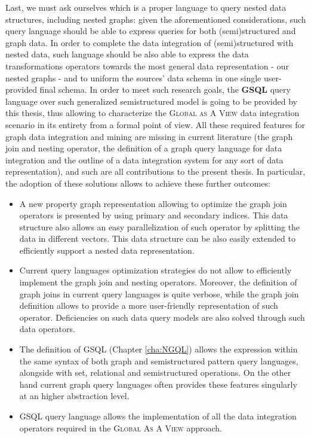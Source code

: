 Last, we must ask ourselves which is a proper language to query nested data structures, including nested graphs: given the aforementioned considerations, such query language should be able to  express queries for both (semi)structured and graph data. In order to complete the data integration of (semi)structured with nested data, such language should be also able to express the data transformations operators towards the most general data representation - our nested graphs - and to uniform the sources' data schema in one single user-provided final schema. In order to meet such research goals, the \textbf{GSQL} query language over such generalized semistructured model is going to be provided by this thesis, thus allowing to characterize the \textsc{Global as A View} data integration scenario in its entirety from a formal point of view. All these required features for graph data integration and mining are missing in current literature (the graph join and nesting operator, the definition of a graph query language for data integration and the outline of a data integration system for any sort of data representation), and such are all contributions to the present thesis. In particular, the adoption of these solutions allows to achieve these further outcomes:
\begin{itemize}
	\item A new property graph representation allowing to optimize the graph join operators is presented by using primary and secondary indices. This data structure also allows an easy parallelization of such operator by splitting the data in different vectors. This data structure can be also easily extended to efficiently support a nested data representation.
	\item Current  query languages optimization strategies do not allow to efficiently implement the graph join and nesting operators. Moreover, the definition of graph joins in current query languages is quite verbose, while the graph join definition allows to provide a more user-friendly representation of such operator. Deficiencies on such data query models are also solved through such data operators.
	\item The definition of GSQL (Chapter \vref{cha:NGQL}) allows the expression within the same syntax of both graph and semistructured pattern query languages, alongside with set, relational and semistructured operations. On the other hand current graph query languages often provides these features singularly at an higher abstraction level.
	\item GSQL query language allows the implementation of all the data integration operators required in the \textsc{Global As A View} approach.
\end{itemize}



